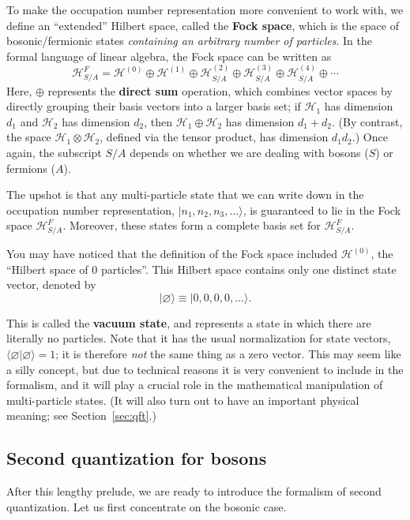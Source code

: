 \documentclass[pra,12pt]{revtex4}
\begin{document}
To make the occupation number representation more convenient to work
with, we define an ``extended'' Hilbert space, called the \textbf{Fock
  space}, which is the space of bosonic/fermionic states
\textit{containing an arbitrary number of particles}.  In the formal
language of linear algebra, the Fock space can be written as
$$\mathscr{H}_{S/A}^F = \mathscr{H}^{(0)} \oplus \mathscr{H}^{(1)} \oplus \mathscr{H}^{(2)}_{S/A} \oplus \mathscr{H}^{(3)}_{S/A} \oplus \mathscr{H}^{(4)}_{S/A} \oplus \cdots$$
Here, $\oplus$ represents the \textbf{direct sum} operation, which
combines vector spaces by directly grouping their basis vectors into a
larger basis set; if $\mathscr{H}_1$ has dimension $d_1$ and
$\mathscr{H}_2$ has dimension $d_2$, then
$\mathscr{H}_1\oplus\mathscr{H}_2$ has dimension $d_1+d_2$.  (By
contrast, the space $\mathscr{H}_1\otimes\mathscr{H}_2$, defined via
the tensor product, has dimension $d_1d_2$.)  Once again, the
subscript $S/A$ depends on whether we are dealing with bosons ($S$) or
fermions ($A$).

The upshot is that any multi-particle state that we can write down in
the occupation number representation, $|n_1,n_2,n_3,\dots\rangle$, is
guaranteed to lie in the Fock space $\mathscr{H}^{F}_{S/A}$.
Moreover, these states form a complete basis set for
$\mathscr{H}^{F}_{S/A}$.

You may have noticed that the definition of the Fock space included
$\mathscr{H}^{(0)}$, the ``Hilbert space of 0 particles''.  This
Hilbert space contains only one distinct state vector, denoted by
$$|\varnothing\rangle \equiv |0,0,0,0,\dots\rangle.$$

This is called the \textbf{vacuum state}, and represents a state in
which there are literally no particles.  Note that it has the usual
normalization for state vectors,
$\langle\varnothing|\varnothing\rangle = 1$; it is therefore
\textit{not} the same thing as a zero vector.  This may seem like a
silly concept, but due to technical reasons it is very convenient to
include in the formalism, and it will play a crucial role in the
mathematical manipulation of multi-particle states.  (It will also
turn out to have an important physical meaning; see
Section~\ref{sec:qft}.)

\subsection{Second quantization for bosons}
\label{sec:second_quantized_bosons}

After this lengthy prelude, we are ready to introduce the formalism of
second quantization.  Let us first concentrate on the bosonic case.  
\end{document}
